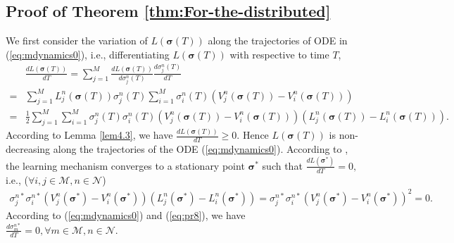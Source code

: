\subsection{Proof of Theorem \ref{thm:For-the-distributed}}\label{proof1-3}
We first consider the variation of $L(\boldsymbol{\sigma}(T))$ along
the trajectories of ODE in (\ref{eq:mdynamics0}), i.e., differentiating
$L(\boldsymbol{\sigma}(T))$ with respective to time $T$, \begin{align}
    & \frac{dL(\boldsymbol{\sigma}(T))}{dT}= \sum_{j=1}^{M}\frac{dL(\boldsymbol{\sigma}(T))}{d\sigma_{j}^{n}(T)}\frac{d\sigma_{j}^{n}(T)}{dT}\nonumber \\
  = & \sum_{j=1}^{M}L_{j}^{n}(\boldsymbol{\sigma}(T))\sigma_{j}^{n}(T)\sum_{i=1}^{M}\sigma_{i}^{n}(T)\left(V_{j}^{n}(\boldsymbol{\sigma}(T))-V_{i}^{n}(\boldsymbol{\sigma}(T))\right)\nonumber \\
  = & \frac{1}{2}\sum_{j=1}^{M}\sum_{i=1}^{M}\sigma_{j}^{n}(T)\sigma_{i}^{n}(T)\left(V_{j}^{n}(\boldsymbol{\sigma}(T))-V_{i}^{n}(\boldsymbol{\sigma}(T))\right)\left(L_{j}^{n}(\boldsymbol{\sigma}(T))-L_{i}^{n}(\boldsymbol{\sigma}(T))\right).\label{eq:pr4}\end{align}
According to Lemma \ref{lem4.3}, we have $\frac{dL(\boldsymbol{\sigma}(T))}{dT}\geq0.$
Hence $L(\boldsymbol{\sigma}(T))$ is non-decreasing along the trajectories
of the ODE (\ref{eq:mdynamics0}). According to \cite{key-99}, the
learning mechanism converges to a stationary point
$\boldsymbol{\sigma}^{*}$ such that $\frac{dL(\boldsymbol{\sigma}^{*})}{dT}=0,$
i.e., ($\forall i,j\in\mathcal{M},n\in\mathcal{N}$)\begin{align}
\sigma_{j}^{n*}\sigma_{i}^{n*}(V_{j}^{n}(\boldsymbol{\sigma}^{*})-V_{i}^{n}(\boldsymbol{\sigma}^{*}))(L_{j}^{n}(\boldsymbol{\sigma}^{*})-L_{i}^{n}(\boldsymbol{\sigma}^{*}))= \sigma_{j}^{n*}\sigma_{i}^{n*}(V_{j}^{n}(\boldsymbol{\sigma}^{*})-V_{i}^{n}(\boldsymbol{\sigma}^{*}))^{2}=0.\label{eq:pr8}\end{align}
According to (\ref{eq:mdynamics0}) and (\ref{eq:pr8}), we have $\frac{d\sigma_{m}^{n*}}{dT}=0,\forall m\in\mathcal{M},n\in\mathcal{N}.$


